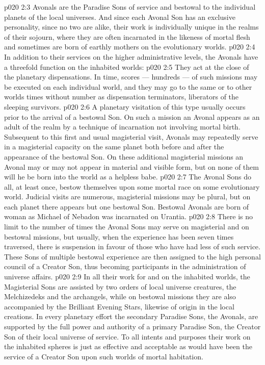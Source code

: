 \vs p020 2:3 Avonals are the Paradise Sons of service and bestowal to the individual planets of the local universes. And since each Avonal Son has an exclusive personality, since no two are alike, their work is individually unique in the realms of their sojourn, where they are often incarnated in the likeness of mortal flesh and sometimes are born of earthly mothers on the evolutionary worlds.
\vs p020 2:4 \pc In addition to their services on the higher administrative levels, the Avonals have a threefold function on the inhabited worlds:
\vs p020 2:5 \bibnobreakspace {} They act at the close of the planetary dispensations. In time, scores --- hundreds --- of such missions may be executed on each individual world, and they may go to the same or to other worlds times without number as dispensation terminators, liberators of the sleeping survivors.
\vs p020 2:6 \bibnobreakspace {} A planetary visitation of this type usually occurs prior to the arrival of a bestowal Son. On such a mission an Avonal appears as an adult of the realm by a technique of incarnation not involving mortal birth. Subsequent to this first and usual magisterial visit, Avonals may repeatedly serve in a magisterial capacity on the same planet both before and after the appearance of the bestowal Son. On these additional magisterial missions an Avonal may or may not appear in material and visible form, but on none of them will he be born into the world as a helpless babe.
\vs p020 2:7 \bibnobreakspace {} The Avonal Sons do all, at least once, bestow themselves upon some mortal race on some evolutionary world. Judicial visits are numerous, magisterial missions may be plural, but on each planet there appears but one bestowal Son. Bestowal Avonals are born of woman as Michael of Nebadon was incarnated on Urantia.
\vs p020 2:8 \pc There is no limit to the number of times the Avonal Sons may serve on magisterial and on bestowal missions, but usually, when the experience has been seven times traversed, there is suspension in favour of those who have had less of such service. These Sons of multiple bestowal experience are then assigned to the high personal council of a Creator Son, thus becoming participants in the administration of universe affairs.
\vs p020 2:9 In all their work for and on the inhabited worlds, the Magisterial Sons are assisted by two orders of local universe creatures, the Melchizedeks and the archangels, while on bestowal missions they are also accompanied by the Brilliant Evening Stars, likewise of origin in the local creations. In every planetary effort the secondary Paradise Sons, the Avonals, are supported by the full power and authority of a primary Paradise Son, the Creator Son of their local universe of service. To all intents and purposes their work on the inhabited spheres is just as effective and acceptable as would have been the service of a Creator Son upon such worlds of mortal habitation.
